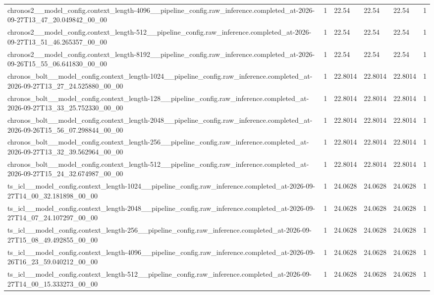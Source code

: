 \begin{tabular}{llllll}
chronos2\_\_model\_config.context\_length-4096\_\_pipeline\_config.raw\_inference.completed\_at-2026-09-27T13\_47\_20.049842\_00\_00 & 1 & 22.54 & 22.54 & 22.54 & 1 \\
chronos2\_\_model\_config.context\_length-512\_\_pipeline\_config.raw\_inference.completed\_at-2026-09-27T13\_51\_46.265357\_00\_00 & 1 & 22.54 & 22.54 & 22.54 & 1 \\
chronos2\_\_model\_config.context\_length-8192\_\_pipeline\_config.raw\_inference.completed\_at-2026-09-26T15\_55\_06.641830\_00\_00 & 1 & 22.54 & 22.54 & 22.54 & 1 \\
chronos\_bolt\_\_model\_config.context\_length-1024\_\_pipeline\_config.raw\_inference.completed\_at-2026-09-27T13\_27\_24.525880\_00\_00 & 1 & 22.8014 & 22.8014 & 22.8014 & 1 \\
chronos\_bolt\_\_model\_config.context\_length-128\_\_pipeline\_config.raw\_inference.completed\_at-2026-09-27T13\_33\_25.752330\_00\_00 & 1 & 22.8014 & 22.8014 & 22.8014 & 1 \\
chronos\_bolt\_\_model\_config.context\_length-2048\_\_pipeline\_config.raw\_inference.completed\_at-2026-09-26T15\_56\_07.298844\_00\_00 & 1 & 22.8014 & 22.8014 & 22.8014 & 1 \\
chronos\_bolt\_\_model\_config.context\_length-256\_\_pipeline\_config.raw\_inference.completed\_at-2026-09-27T13\_32\_39.562964\_00\_00 & 1 & 22.8014 & 22.8014 & 22.8014 & 1 \\
chronos\_bolt\_\_model\_config.context\_length-512\_\_pipeline\_config.raw\_inference.completed\_at-2026-09-27T15\_24\_32.674987\_00\_00 & 1 & 22.8014 & 22.8014 & 22.8014 & 1 \\
ts\_icl\_\_model\_config.context\_length-1024\_\_pipeline\_config.raw\_inference.completed\_at-2026-09-27T14\_00\_32.181898\_00\_00 & 1 & 24.0628 & 24.0628 & 24.0628 & 1 \\
ts\_icl\_\_model\_config.context\_length-2048\_\_pipeline\_config.raw\_inference.completed\_at-2026-09-27T14\_07\_24.107297\_00\_00 & 1 & 24.0628 & 24.0628 & 24.0628 & 1 \\
ts\_icl\_\_model\_config.context\_length-256\_\_pipeline\_config.raw\_inference.completed\_at-2026-09-27T15\_08\_49.492855\_00\_00 & 1 & 24.0628 & 24.0628 & 24.0628 & 1 \\
ts\_icl\_\_model\_config.context\_length-4096\_\_pipeline\_config.raw\_inference.completed\_at-2026-09-26T16\_23\_59.040212\_00\_00 & 1 & 24.0628 & 24.0628 & 24.0628 & 1 \\
ts\_icl\_\_model\_config.context\_length-512\_\_pipeline\_config.raw\_inference.completed\_at-2026-09-27T14\_00\_15.333273\_00\_00 & 1 & 24.0628 & 24.0628 & 24.0628 & 1 \\

\end{tabular}
